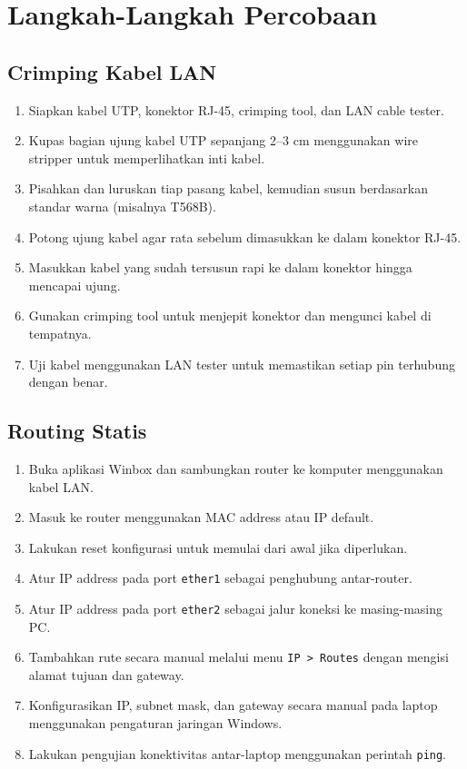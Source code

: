 \section{Langkah-Langkah Percobaan}
\subsection{Crimping Kabel LAN}
\begin{enumerate}
    \item Siapkan kabel UTP, konektor RJ-45, crimping tool, dan LAN cable tester.
    \item Kupas bagian ujung kabel UTP sepanjang 2--3 cm menggunakan wire stripper untuk memperlihatkan inti kabel.
    \item Pisahkan dan luruskan tiap pasang kabel, kemudian susun berdasarkan standar warna (misalnya T568B).
    \item Potong ujung kabel agar rata sebelum dimasukkan ke dalam konektor RJ-45.
    \item Masukkan kabel yang sudah tersusun rapi ke dalam konektor hingga mencapai ujung.
    \item Gunakan crimping tool untuk menjepit konektor dan mengunci kabel di tempatnya.
    \item Uji kabel menggunakan LAN tester untuk memastikan setiap pin terhubung dengan benar.
\end{enumerate}

\subsection{Routing Statis}
\begin{enumerate}
    \item Buka aplikasi Winbox dan sambungkan router ke komputer menggunakan kabel LAN.
    \item Masuk ke router menggunakan MAC address atau IP default.
    \item Lakukan reset konfigurasi untuk memulai dari awal jika diperlukan.
    \item Atur IP address pada port \texttt{ether1} sebagai penghubung antar-router.
    \item Atur IP address pada port \texttt{ether2} sebagai jalur koneksi ke masing-masing PC.
    \item Tambahkan rute secara manual melalui menu \texttt{IP > Routes} dengan mengisi alamat tujuan dan gateway.
    \item Konfigurasikan IP, subnet mask, dan gateway secara manual pada laptop menggunakan pengaturan jaringan Windows.
    \item Lakukan pengujian konektivitas antar-laptop menggunakan perintah \texttt{ping}.
\end{enumerate}

